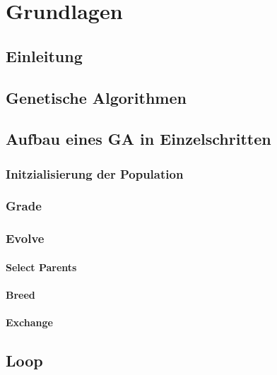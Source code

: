 
\section{Grundlagen}
\label{sec:Grundlagen}
\subsection{Einleitung}

\subsection{Genetische Algorithmen}

\subsection{Aufbau eines GA in Einzelschritten}
\subsubsection{Initzialisierung der Population}
\subsubsection{Grade}
\subsubsection{Evolve}
\paragraph{Select Parents}
\paragraph{Breed}
\paragraph{Exchange}
\subsection{Loop}


